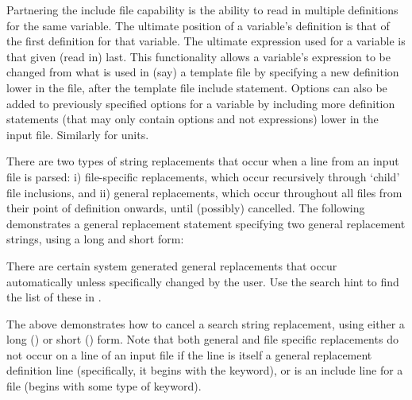 Partnering the include file capability is the ability to read in multiple definitions for the same variable.  The ultimate position of a variable's definition is that of the first definition for that variable.  The ultimate expression used for a variable is that given (read in) last.  This functionality allows a variable's expression to be changed from what is used in (say) a template file by specifying a new definition lower in the file, after the template file include statement.  Options can also be added to previously specified options for a variable by including more definition statements (that may only contain options and not expressions) lower in the input file.  Similarly for units.


There are two types of string replacements that occur when a line from an input file is parsed:  i) file-specific replacements, which occur recursively through `child' file inclusions, and ii) general replacements, which occur throughout all files from their point of definition onwards, until (possibly) cancelled.  The following demonstrates a general replacement statement specifying two general replacement strings, using a long and short form:


There are certain system generated general replacements that occur automatically unless specifically changed by the user.  Use the search hint to find the list of these in .


The above demonstrates how to cancel a search string replacement, using either a long () or short () form.  Note that both general and file specific replacements do not occur on a line of an input file if the line is itself a general replacement definition line (specifically, it begins with the  keyword), or is an include line for a file (begins with some type of  keyword).



